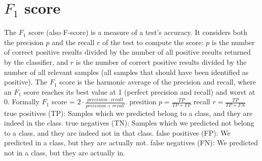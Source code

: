 \section{$F_1$ score}
The $F_1$ score (also F-score) is a measure of a test's accuracy. It considers both the precision $p$ and the recall $r$ of the test to compute the score: $p$ is the number of correct positive results divided by the number of all positive results returned by the classifier, and $r$ is the number of correct positive results divided by the number of all relevant samples (all samples that should have been identified as positive). The $F_1$ score is the harmonic average of the precision and recall, where an $F_1$ score reaches its best value at 1 (perfect precision and recall) and worst at 0.
Formally $F_1$ score = $2 \cdot \frac{precision \cdot recall}{precision + recall}$.
presition $p = \frac{TP}{TP + FP}$
recall $r = \frac{TP}{TP + FN}$
true positives (TP): Samples which we predicted belong to a class, and they are indeed in the class.
true negatives (TN): Samples which we predicted not belong to a class, and they are indeed not in that class.
false positives (FP): We predicted in a class, but they are actually not.
false negatives (FN): We predicted not in a class, but they are actually in.
